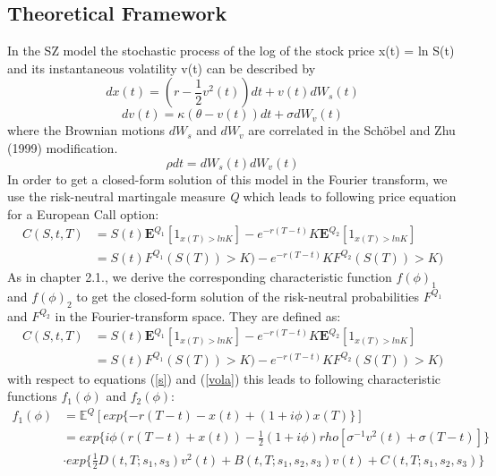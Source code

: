 \documentclass[a4paper,11pt]{article}
\begin{document}
\subsection{Theoretical Framework}
In the SZ model the stochastic process of the log of the stock price x(t) = ln S(t) and its instantaneous volatility v(t) can be described by
\begin{equation}
dx(t)=(r-\dfrac{1}{2}v^2 (t))dt + v(t) dW_s(t)
\label{s}
\end{equation}
\begin{equation}
dv(t)=\kappa(\theta - v(t))dt + \sigma dW_v(t)
\label{vola}
\end{equation}
where the Brownian motions $dW_s$ and $dW_v$ are correlated in the Sch\"obel and Zhu (1999) modification.
\begin{equation*}
\rho dt= dW_s(t) dW_v(t)
\end{equation*}
In order to get a closed-form solution of this model in the Fourier transform, we use the risk-neutral martingale measure \textit{Q} which leads to following price equation for a European Call option:
\begin{align*}
C(S,t,T)&=S(t) \mathbf{E}^{Q_1}[1_{x(T)>lnK}] - e^{-r(T-t)}K \mathbf{E}^{Q_2}[1_{x(T)>lnK}] \\
&= S(t) F^{Q_1}(S(T))>K) - e^{-r(T-t)}K F^{Q_2}(S(T))>K)
\end{align*}
As in chapter 2.1., we derive the corresponding characteristic function $f(\phi)_1$ and $f(\phi)_2$ to get the closed-form solution of the risk-neutral probabilities  $F^{Q_1}$ and  $F^{Q_2}$ in the Fourier-transform space. They are defined as:
\begin{align*}
C(S,t,T)&=S(t) \mathbf{E}^{Q_1}[1_{x(T)>lnK}] - e^{-r(T-t)}K \mathbf{E}^{Q_2}[1_{x(T)>lnK}] \\
&= S(t) F^{Q_1}(S(T))>K) - e^{-r(T-t)}K F^{Q_2}(S(T))>K)
\end{align*}
with respect to equations (\ref{s}) and (\ref{vola}) this leads to following characteristic functions $f_1(\phi)$ and $f_2(\phi)$:
\begin{equation}
\begin{split}
f_1(\phi)&=\mathbb{E}^Q[exp\{-r(T - t) - x(t) + (1+i\phi)x(T)\}] \\
&= exp\{ i\phi(r(T-t)+ x(t)) -\frac{1}{2}(1 + i\phi)rho[\sigma^{-1}v^2(t)+\sigma(T-t)]\} \\
&\cdot exp\{\frac{1}{2}D(t,T;s_1,s_3)v^2(t) +B(t,T;s_1,
s_2,s_3)v(t)+C(t,T;s_1,s_2,s_3)\}
\end{split} 
\label{cf21}
\end{equation} 
\end{document}

